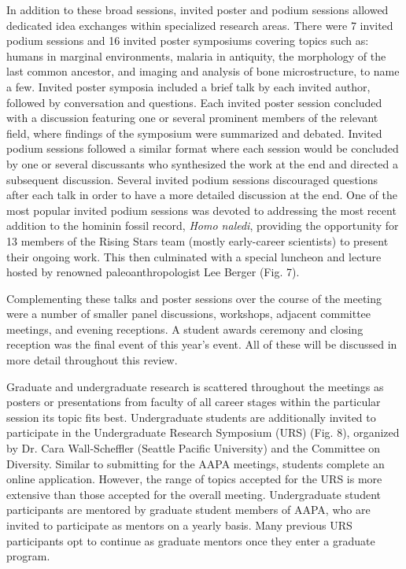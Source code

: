 \documentclass[english]{ijsra}
\begin{document}
In addition to these broad sessions, 
invited poster and podium sessions allowed dedicated idea exchanges within specialized research areas. 
There were 7 invited podium sessions and 16 invited poster symposiums covering topics such as: humans in marginal environments, 
malaria in antiquity, the morphology of the last common ancestor, and imaging and analysis of bone microstructure, to name a few. 
Invited poster symposia included a brief talk by each invited author, followed by conversation and questions. 
Each invited poster session concluded with a discussion featuring one or several prominent members of the relevant field,
where findings of the symposium were summarized and debated. 
Invited podium sessions followed a similar format where each session would be concluded by one or several discussants who synthesized
the work at the end and directed a subsequent discussion. 
Several invited podium sessions discouraged questions after each talk in order to have a more detailed discussion at the end.
One of the most popular invited podium sessions was devoted to addressing the most recent addition to the hominin fossil record,
\emph{Homo naledi}, providing the opportunity for 13 members of the Rising Stars team (mostly early-career scientists)
to present their ongoing work. 
This then culminated with a special luncheon and lecture hosted by renowned paleoanthropologist Lee Berger (Fig. 7).

Complementing these talks and poster sessions over the course of the meeting were a number of smaller panel discussions,
workshops, adjacent committee meetings, and evening receptions. 
A student awards ceremony and closing reception was the final event of this year’s event.  
All of these will be discussed in more detail throughout this review.

Graduate  and undergraduate research is scattered throughout the meetings as posters or presentations
from faculty of all career stages within the particular session its topic fits best. Undergraduate students are additionally invited
to participate in the Undergraduate Research Symposium (URS) (Fig. 8), organized by Dr. Cara Wall-Scheffler (Seattle Pacific
University) and the Committee on Diversity.  Similar to submitting for the AAPA meetings, students complete an online application.
However, the range of topics accepted for the URS is more extensive than those accepted for the overall meeting.
Undergraduate student participants are mentored by graduate student members of AAPA,
who are invited to participate as mentors on a yearly basis.
Many previous URS participants opt to continue as graduate mentors once they enter a graduate program.
\end{document}
